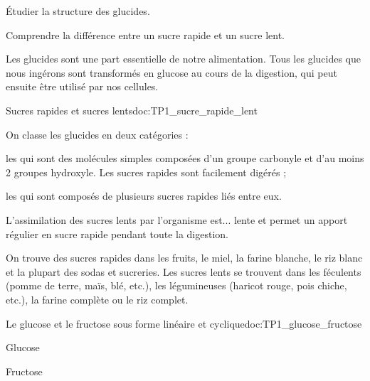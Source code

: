 \tetePremStssBiol
{}

\begin{objectifs}
  \item Étudier la structure des glucides.
  \item Comprendre la différence entre un sucre rapide et un sucre lent.
\end{objectifs}

\begin{contexte}
  Les glucides sont une part essentielle de notre alimentation.
  Tous les glucides que nous ingérons sont transformés en glucose au cours de la digestion,
  qui peut ensuite être utilisé par nos cellules.

\end{contexte}



\begin{doc}{Sucres rapides et sucres lents}{doc:TP1_sucre_rapide_lent}
  \begin{importants}
    On classe les glucides en deux catégories :
    \begin{listePoints}
      \item les  qui sont des molécules simples composées d'un groupe carbonyle et d'au moins 2 groupes hydroxyle. Les sucres rapides sont facilement digérés ;
      \item les  qui sont composés de plusieurs sucres rapides liés entre eux.  
    \end{listePoints}
    L'assimilation des sucres lents par l'organisme est... lente et permet un apport régulier en sucre rapide pendant toute la digestion.
  \end{importants}

  On trouve des sucres rapides dans les fruits, le miel, la farine blanche, le riz blanc et la plupart des sodas et sucreries.
  Les sucres lents se trouvent dans les féculents (pomme de terre, maïs, blé, etc.), les légumineuses (haricot rouge, pois chiche, etc.), la farine complète ou le riz complet.
\end{doc}

\begin{doc}{Le glucose et le fructose sous forme linéaire et cyclique}{doc:TP1_glucose_fructose}
  \begin{multicols}{2}
  \begin{center}
    \separationBlocs{
      \centering
      \chemfig{[:-90]!\glucoseSemiDev}
    }{
      \centering
      \chemfig{!\glucoseHaw} \\[4pt]
    }
    Glucose

    \separationBlocs{
      \centering
      \chemfig{[:-90] !\fructoseSemiDev} \;
    }{
      \centering
      \chemfig{!\fructoseHaw} \\[4pt]
    }
    Fructose
  \end{center}
  \end{multicols}
\end{doc}


